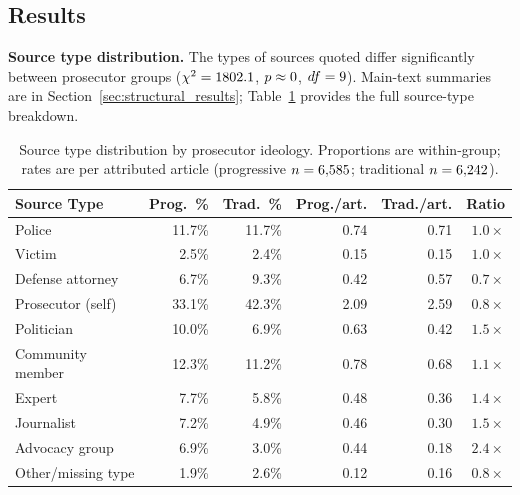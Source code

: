 \documentclass[12pt, letterpaper]{article}
\begin{document}
\begin{appendices}
\subsection*{Results}

\textbf{Source type distribution.} The types of sources quoted differ significantly between prosecutor groups ($\chi^2 = 1802.1$, $p \approx 0$, $df = 9$). Main-text summaries are in Section~\ref{sec:structural_results}; Table~\ref{tab:sourcetypes} provides the full source-type breakdown.

\begin{table}[ht]
\centering
\caption{Source type distribution by prosecutor ideology. Proportions are within-group; rates are per attributed article (progressive $n=6{,}585$; traditional $n=6{,}242$).}
\label{tab:sourcetypes}
\small
\begin{tabular}{lrrrrr}
\toprule
Source Type & Prog.\ \% & Trad.\ \% & Prog./art. & Trad./art. & Ratio \\
\midrule
Police             & 11.7\% & 11.7\% & 0.74 & 0.71 & $1.0\times$ \\
Victim             &  2.5\% &  2.4\% & 0.15 & 0.15 & $1.0\times$ \\
Defense attorney   &  6.7\% &  9.3\% & 0.42 & 0.57 & $0.7\times$ \\
Prosecutor (self)  & 33.1\% & 42.3\% & 2.09 & 2.59 & $0.8\times$ \\
Politician         & 10.0\% &  6.9\% & 0.63 & 0.42 & $\mathbf{1.5\times}$ \\
Community member   & 12.3\% & 11.2\% & 0.78 & 0.68 & $1.1\times$ \\
Expert             &  7.7\% &  5.8\% & 0.48 & 0.36 & $\mathbf{1.4\times}$ \\
Journalist         &  7.2\% &  4.9\% & 0.46 & 0.30 & $1.5\times$ \\
Advocacy group     &  6.9\% &  3.0\% & 0.44 & 0.18 & $\mathbf{2.4\times}$ \\
Other/missing type &  1.9\% &  2.6\% & 0.12 & 0.16 & $0.8\times$ \\
\bottomrule
\end{tabular}
\end{table}


\end{appendices}
\end{document}
